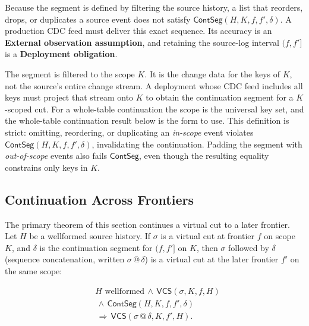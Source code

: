 \documentclass[letterpaper,10pt,twocolumn]{article}
\newcommand{\VCS}{\mathsf{VCS}}
\newcommand{\ContSeg}{\mathsf{ContSeg}}
\begin{document}
Because the segment is defined by filtering the source history, a list
that reorders, drops, or duplicates a source event does not satisfy
$\ContSeg(H,K,f,f',\delta)$. A production CDC feed must deliver this
exact sequence. Its accuracy is an \textbf{External observation
assumption}, and retaining the source-log interval $(f,f']$ is a
\textbf{Deployment obligation}.

The segment is filtered to the scope $K$. It is the change data for
the keys of $K$, not the source's entire change stream. A deployment
whose CDC feed includes all keys must project that stream onto $K$ to
obtain the continuation segment for a $K$-scoped cut. For a
whole-table continuation the scope is the universal key set, and the
whole-table continuation result below is the form to use.
This definition is strict: omitting, reordering, or duplicating an
\emph{in-scope} event violates $\ContSeg(H,K,f,f',\delta)$, invalidating
the continuation. Padding the segment with \emph{out-of-scope} events
also fails $\ContSeg$, even though the resulting equality constrains
only keys in $K$.

\subsection{Continuation Across
Frontiers}\label{continuation-across-frontiers}

The primary theorem of this section continues a virtual cut to a later
frontier. Let $H$ be a wellformed source history. If $\sigma$ is a
virtual cut at frontier $f$ on scope $K$, and $\delta$ is the
continuation segment for $(f,f']$ on $K$, then $\sigma$ followed by
$\delta$ (sequence concatenation, written $\sigma \mathbin{@} \delta$)
is a virtual cut at the later frontier $f'$ on the same scope:

\[
\begin{aligned}
&H \text{ wellformed} \,\land\, \VCS(\sigma,K,f,H)\\
&\,\land\, \ContSeg(H,K,f,f',\delta)\\
&\,\Longrightarrow\, \VCS(\sigma \mathbin{@} \delta, K, f', H).
\end{aligned}
\]
\end{document}
